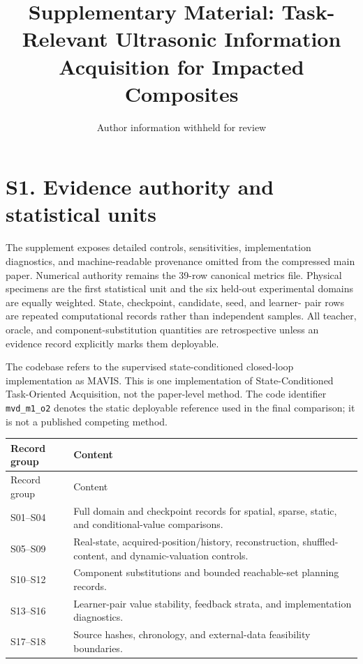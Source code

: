 \documentclass[11pt]{article}
\title{Supplementary Material: Task-Relevant Ultrasonic Information
Acquisition for Impacted Composites}
\author{Author information withheld for review}
\date{}
\begin{document}
\maketitle

\section{S1. Evidence authority and statistical units}

The supplement exposes detailed controls, sensitivities, implementation
diagnostics, and machine-readable provenance omitted from the compressed main
paper. Numerical authority remains the 39-row canonical metrics file. Physical
specimens are the first statistical unit and the six held-out experimental
domains are equally weighted. State, checkpoint, candidate, seed, and learner-
pair rows are repeated computational records rather than independent samples.
All teacher, oracle, and component-substitution quantities are retrospective
unless an evidence record explicitly marks them deployable.

The codebase refers to the supervised state-conditioned closed-loop
implementation as MAVIS. This is one implementation of State-Conditioned
Task-Oriented Acquisition, not the paper-level method. The code identifier
\texttt{mvd\_m1\_o2} denotes the static deployable reference used in the final
comparison; it is not a published competing method.

\begin{longtable}{@{}p{}p{}@{}}
\toprule
Record group & Content \\
\midrule
\endfirsthead
\toprule
Record group & Content \\
\midrule
\endhead
\bottomrule
\endfoot
S01--S04 & Full domain and checkpoint records for spatial, sparse, static, and conditional-value comparisons. \\
S05--S09 & Real-state, acquired-position/history, reconstruction, shuffled-content, and dynamic-valuation controls. \\
S10--S12 & Component substitutions and bounded reachable-set planning records. \\
S13--S16 & Learner-pair value stability, feedback strata, and implementation diagnostics. \\
S17--S18 & Source hashes, chronology, and external-data feasibility boundaries. \\
\end{longtable}
\end{document}

